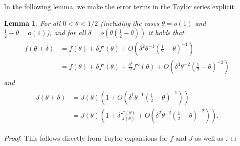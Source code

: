 \documentclass[a4paper,12pt]{article}
\newtheorem{lemma}[theorem]{Lemma}
\theoremstyle{definition}
\begin{document}
In the following lemma, we make the error terms in the Taylor series explicit.
\begin{lemma}\label{lem_taylor_f_J}
For all $0<\theta<1/2$ (including the cases $\theta=o(1)$ and $\frac 1 2 -\theta =o(1)$), and for all $\delta=o\left(\theta\left(\frac 1 2 -\theta\right)\right)$ it holds that
\begin{align}
\begin{aligned}
f(\theta+\delta) 
    &= f(\theta)+\delta f'(\theta)+O\left(\delta^2\theta^{-1}\left(\frac 1 2 -\theta \right)^{-1}\right)\\
    &= f(\theta)+\delta f'(\theta)+\frac{\delta^2}{2}f''(\theta)+O\left(\delta^3\theta^{-2}\left(\frac 1 2 -\theta \right)^{-2}\right)
\end{aligned}
\label{eq_fshift}
\end{align}
and
\begin{align}
\begin{aligned}
J(\theta+\delta)
    &= J(\theta)\left(1+O\left(\delta^{1}\theta^{-1}\left(\frac 1 2 -\theta \right)^{-1}\right)\right)\\
    &= J(\theta)\left(1+\delta\frac{J'(\theta)}{J(\theta)}+O\left(\delta^{2}\theta^{-2}\left(\frac 1 2 -\theta \right)^{-2}\right)\right).
\end{aligned}
\label{eq_Jshift}
\end{align}



\end{lemma}
\begin{proof}
This follows directly from Taylor expansions for $f$ and $J$ as well as
.
%

\end{proof}
\end{document}
